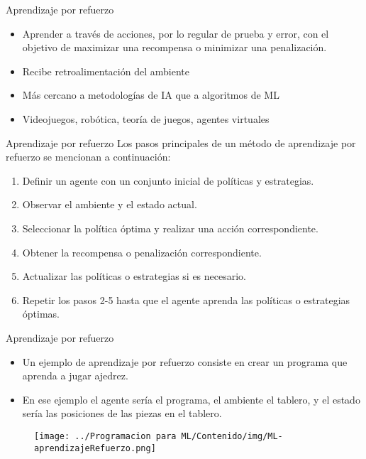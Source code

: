 \documentclass[11pt,aspectratio=169]{beamer}
\begin{document}
\begin{frame}{Aprendizaje por refuerzo}
\begin{itemize}
	\item Aprender a través de acciones, por lo regular de prueba y error, con el objetivo de maximizar una recompensa o minimizar una penalización. \pause
	\item Recibe retroalimentación del ambiente\pause
	\item Más cercano a metodologías de IA que a algoritmos de ML\pause
	\item Videojuegos, robótica, teoría de juegos, agentes virtuales
\end{itemize}
\end{frame}

\begin{frame}{Aprendizaje por refuerzo}
Los pasos principales de un método de aprendizaje por refuerzo se mencionan a continuación:\pause
\begin{enumerate}
	\item Definir un agente con un conjunto inicial de políticas y estrategias.\pause
	\item Observar el ambiente y el estado actual.\pause
	\item Seleccionar la política óptima y realizar una acción correspondiente.\pause
	\item Obtener la recompensa o penalización correspondiente.\pause
	\item Actualizar las políticas o estrategias si es necesario.\pause
	\item Repetir los pasos 2-5 hasta que el agente aprenda las políticas o estrategias óptimas.
\end{enumerate}
\end{frame}

\begin{frame}{Aprendizaje por refuerzo}
\begin{itemize}
	\item Un ejemplo de aprendizaje por refuerzo consiste en crear un programa que aprenda a jugar ajedrez.\pause
	\item En ese ejemplo el agente sería el programa, el ambiente el tablero, y el estado sería las posiciones de las piezas en el tablero. \pause
\end{itemize}
\begin{figure}[H]
	\centering
	\texttt{[image: ../Programacion para ML/Contenido/img/ML-aprendizajeRefuerzo.png]}
\end{figure}	
\end{frame}
\end{document}
